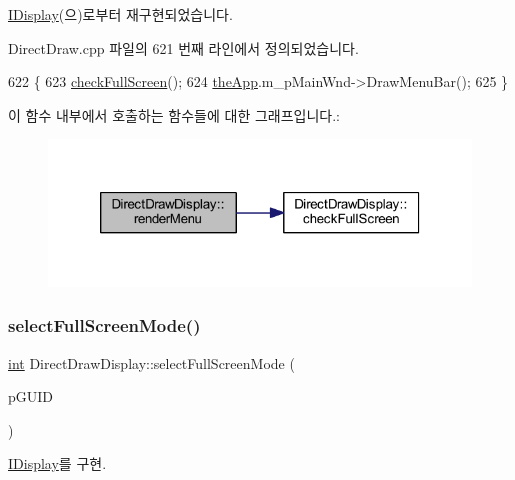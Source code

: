 \mbox{\hyperlink{class_i_display_ad6fc199a615635440ca01485c1283d41}{I\+Display}}(으)로부터 재구현되었습니다.



Direct\+Draw.\+cpp 파일의 621 번째 라인에서 정의되었습니다.


\begin{DoxyCode}
622 \{
623   \mbox{\hyperlink{class_direct_draw_display_ada4eacae559651471181ec781dce1716}{checkFullScreen}}();
624   \mbox{\hyperlink{_v_b_a_8cpp_a8095a9d06b37a7efe3723f3218ad8fb3}{theApp}}.m\_pMainWnd->DrawMenuBar();
625 \}
\end{DoxyCode}
이 함수 내부에서 호출하는 함수들에 대한 그래프입니다.\+:
\nopagebreak
\begin{figure}[H]
\begin{center}
\leavevmode
\includegraphics[width=320pt]{class_direct_draw_display_a0a207e0d27c3ccf35d0b5b56fe78678e_cgraph}
\end{center}
\end{figure}
\mbox{\label{class_direct_draw_display_a10d4f6b14b3f4de2edb60e05a4277d25}} 
\subsubsection{\texorpdfstring{select\+Full\+Screen\+Mode()}{selectFullScreenMode()}}
{\footnotesize\ttfamily \mbox{\hyperlink{_util_8cpp_a0ef32aa8672df19503a49fab2d0c8071}{int}} Direct\+Draw\+Display\+::select\+Full\+Screen\+Mode (\begin{DoxyParamCaption}\item[{G\+U\+ID $\ast$$\ast$}]{p\+G\+U\+ID }\end{DoxyParamCaption})\hspace{0.3cm}{\ttfamily [virtual]}}



\mbox{\hyperlink{class_i_display_a2f7a55f63c5e4b24245aa88228afab68}{I\+Display}}를 구현.



